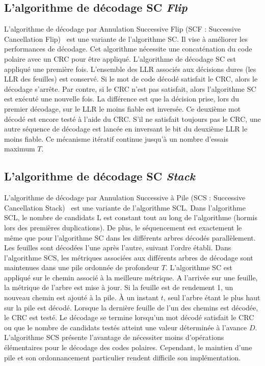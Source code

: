 \subsection{L'algorithme de décodage SC \textit{Flip}}

	L'algorithme de décodage par Annulation Successive \og Flip \fg (SCF : Successive Cancellation Flip)~\cite{afisiadis_low-complexity_2014} est une variante de l'algorithme SC. Il vise à améliorer les performances de décodage. Cet algorithme nécessite une concaténation du code polaire avec un CRC pour être appliqué. L'algorithme de décodage SC est appliqué une première fois. L'ensemble des LLR associés aux décisions dures (les LLR des feuilles) est conservé. Si le mot de code décodé satisfait le CRC, alors le décodage s'arrête. Par contre, si le CRC n'est pas satisfait, alors l'algorithme SC est exécuté une nouvelle fois. La différence est que la décision prise, lors du premier décodage, sur le LLR le moins fiable est inversée. Ce deuxième mot décodé est encore testé à l'aide du CRC. S'il ne satisfait toujours pas le CRC, une autre séquence de décodage est lancée en inversant le bit du deuxième LLR le moins fiable. Ce mécanisme itératif continue jusqu'à un nombre d'essais maximum $T$.


	\subsection{L'algorithme de décodage SC \textit{Stack}}
	L'algorithme de décodage par Annulation Successive à Pile (SCS : Successive Cancellation Stack)~\cite{niu_stack_2012} est une variante de l'algorithme SCL. Dans l'algorithme SCL, le nombre de candidats $\mathrm{L}$ est constant tout au long de l'algorithme (hormis lors des premières duplications). De plus, le séquencement est exactement le même que pour l'algorithme SC dans les différents arbres décodés parallèlement. Les feuilles sont décodées l'une après l'autre, suivant l'ordre établi. Dans l'algorithme SCS, les métriques associées aux différents arbres de décodage sont maintenues dans une pile ordonnée de profondeur $T$. L'algorithme SC est appliqué sur le chemin associé à la meilleure métrique. A l'arrivée sur une feuille, la métrique de l'arbre est mise à jour. Si la feuille est de rendement 1, un nouveau chemin est ajouté à la pile. \`A un instant $t$, seul l'arbre étant le plus haut sur la pile est décodé. Lorsque la dernière feuille de l'un des chemins est décodée, le CRC est testé. Le décodage se termine lorsqu'un mot décodé satisfait le CRC ou que le nombre de candidats testés atteint une valeur déterminée à l'avance $D$. L'algorithme SCS présente l'avantage de nécessiter moins d'opérations élémentaires pour le décodage des codes polaires. Cependant, le maintien d'une pile et son ordonnancement particulier rendent difficile son implémentation.

